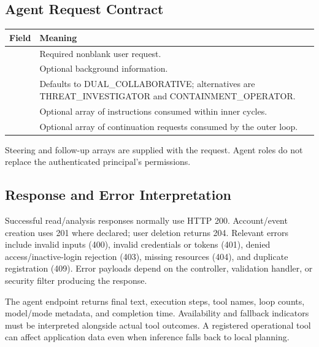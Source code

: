 \subsection{Agent Request Contract}
\begingroup\footnotesize{}\renewcommand{\arraystretch}{1.15}
\begin{tabularx}{\textwidth}{p{4.7cm}Y}\toprule Field & Meaning\\\midrule
{} & Required nonblank user request.\\
 & Optional background information.\\
 & Defaults to DUAL\_COLLABORATIVE; alternatives are THREAT\_INVESTIGATOR and CONTAINMENT\_OPERATOR.\\
 & Optional array of instructions consumed within inner cycles.\\
 & Optional array of continuation requests consumed by the outer loop.\\\bottomrule
\end{tabularx}\endgroup\par
Steering and follow-up arrays are supplied with the request. Agent roles do not replace the authenticated principal's permissions.

\subsection{Response and Error Interpretation}
Successful read/analysis responses normally use HTTP 200. Account/event creation uses 201 where declared; user deletion returns 204. Relevant errors include invalid inputs (400), invalid credentials or tokens (401), denied access/inactive-login rejection (403), missing resources (404), and duplicate registration (409). Error payloads depend on the controller, validation handler, or security filter producing the response.

The agent endpoint returns final text, execution steps, tool names, loop counts, model/mode metadata, and completion time. Availability and fallback indicators must be interpreted alongside actual tool outcomes. A registered operational tool can affect application data even when inference falls back to local planning.
